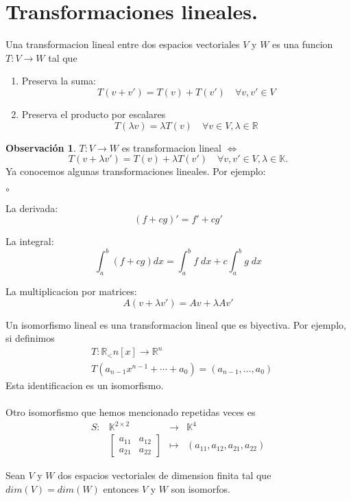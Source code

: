 \documentclass{article}
\theoremstyle{definition}
\theoremstyle{definition}
\newtheorem*{obs}{Observación}
\theoremstyle{remark}
\begin{document}
\section{Transformaciones lineales.}
\begin{defi}
  Una transformacion lineal entre dos espacios vectoriales $V$ y $W$ es una funcion $T : V \to W$ tal que \begin{enumerate}[label=(\arabic*)]
    \item Preserva la suma: \[
T(v+v')=T(v)+T(v')\quad \forall v,v' \in V
      \]
    \item Preserva el producto por escalares \[
        T(\lambda v)=\lambda T(v) \quad \forall v \in V, \lambda \in \mathbb{R}
      \]
  \end{enumerate}
\end{defi}
\begin{obs}
 $T : V \to W$ es transformacion lineal $\Leftrightarrow$ \[
   T(v+\lambda v') = T(v) + \lambda T(v') \quad \forall v,v' \in V, \lambda \in \mathbb{K}.
 \]
 Ya conocemos algunas transformaciones lineales. Por ejemplo: \begin{list}{$\circ$}{}  
 \item  La derivada: \[
     (f+cg)'=f'+cg'
   \]
 \item La integral: \[
     \int_{a}^{b}(f+cg)dx=\int_{a}^{b}f\; dx+c\int_{a}^{b}g \; dx
     \]
   \item La multiplicacion por matrices: \[
A(v+\lambda v')=Av+\lambda Av'
   \]
\end{list}
\end{obs}
Un isomorfismo lineal es una transformacion lineal que es biyectiva. Por ejemplo, si definimos \[
  \begin{aligned} 
&T:\mathbb{R}_<n[x] \to \mathbb{R}^n \\
&T(a_{n-1}x^{n-1}+\cdots +a_{0})=(a_{n-1}, \dots , a_{0})
  \end{aligned}
\]
Esta identificacion es un isomorfismo. \\\\
Otro isomorfismo que hemos mencionado repetidas veces es \[
  \begin{array}{lccc}
  S : &  \mathbb{K}^{2 \times 2} & \to & \mathbb{K}^4 \\
      & \begin{bmatrix}a_{11} & a_{12} \\ a_{21} & a_{22} \end{bmatrix} & \mapsto & (a_{11},a_{12},a_{21},a_{22})
  \end{array}
\]
\begin{teo}
  Sean $V$ y $W$ dos espacios vectoriales de dimension finita tal que $dim(V)=dim(W)$ entonces $V$ y $W$ son isomorfos.
\end{teo}
\pagebreak
\end{document}
